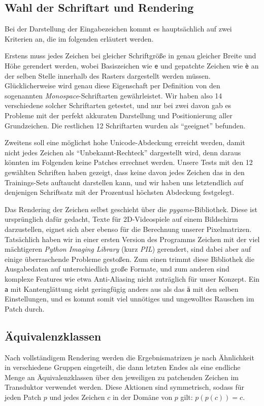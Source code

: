 \documentclass[11pt,a4paper]{article}
\begin{document}
\subsection{Wahl der Schriftart und Rendering}
Bei der Darstellung der Eingabezeichen kommt es hauptsächlich auf zwei Kriterien an, die im folgenden erläutert werden.

Erstens muss jedes Zeichen bei gleicher Schriftgröße in genau gleicher Breite und Höhe gerendert werden, wobei Basiszeichen wie \texttt{e} und gepatchte Zeichen wie \texttt{è} an der selben Stelle innerhalb des Rasters dargestellt werden müssen.
Glücklicherweise wird genau diese Eigenschaft per Definition von den sogenannten \textit{Monospace}-Schriftarten gewährleistet. Wir haben also 14 verschiedene solcher Schriftarten getestet, und nur bei zwei davon gab es Probleme mit der perfekt akkuraten Darstellung und Positionierung aller Grundzeichen. Die restlichen 12 Schriftarten wurden als \enquote{geeignet} befunden.

Zweitens soll eine möglichst hohe Unicode-Abdeckung erreicht werden, damit nicht jedes Zeichen als \enquote{Unbekannt-Rechteck} dargestellt wird, denn daraus könnten im Folgenden keine Patches errechnet werden. Unsere Tests mit den 12 gewählten Schriften haben gezeigt, dass keine davon jedes Zeichen das in den Trainings-Sets auftaucht darstellen kann, und wir haben uns letztendlich auf denjenigen Schriftsatz mit der Prozentual höchsten Abdeckung festgelegt.

Das Rendering der Zeichen selbst geschieht über die \textit{pygame}-Bibliothek. Diese ist ursprünglich dafür gedacht, Texte für 2D-Videospiele auf einem Bildschirm darzustellen, eignet sich aber ebenso für die Berechnung unserer Pixelmatrizen. Tatsächlich haben wir in einer ersten Version des Programms Zeichen mit der viel mächtigeren \textit{Python Imaging Library} (kurz \textit{PIL}) gerendert, sind dabei aber auf einige überraschende Probleme gestoßen. Zum einen trimmt diese Bibliothek die Ausgabedaten auf unterschiedlich große Formate, und zum anderen sind komplexe Features wie etwa Anti-Aliasing nicht zuträglich für unser Konzept. Ein \texttt{a} mit Kantenglättung sieht geringfügig anders aus als das \texttt{ä} mit den selben Einstellungen, und es kommt somit viel unnötiges und ungewolltes Rauschen im Patch durch.

\subsection{Äquivalenzklassen}
Nach vollständigem Rendering werden die Ergebnismatrizen je nach Ähnlichkeit in verschiedene Gruppen eingeteilt, die dann letzten Endes als eine endliche Menge an Äquivalenzklassen über den jeweiligen zu patchenden Zeichen im Transduktor verwendet werden. Diese Aktionen sind symmetrisch, sodass für jeden Patch $p$ und jedes Zeichen $c$ in der Domäne von $p$ gilt: $p(p(c)) = c$.
\end{document}
